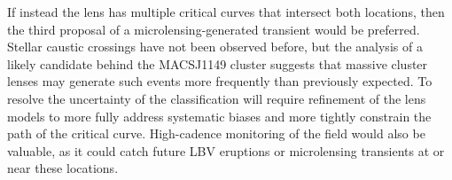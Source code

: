 If instead the  lens has multiple critical curves that
intersect both \spock locations, then the third proposal of a
microlensing-generated transient would be preferred.  Stellar caustic
crossings have not been observed before, but the analysis of a likely
candidate behind the MACSJ1149 cluster suggests that massive cluster
lenses may generate such events more frequently than previously
expected\citep{Kelly:2017}. To resolve the uncertainty of the \spock
classification will require refinement of the lens models to more
fully address systematic biases and more tightly constrain the path of
the critical curve.  High-cadence monitoring of the  field
would also be valuable, as it could catch future LBV eruptions or
microlensing transients at or near these locations.
